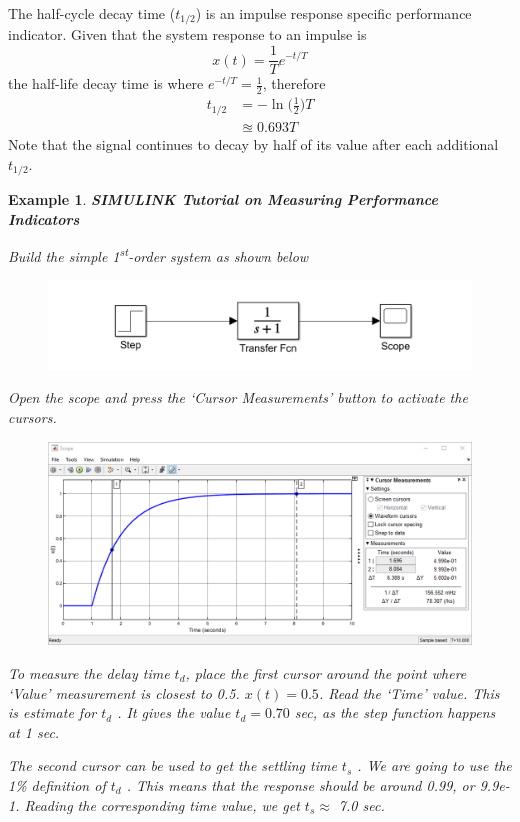 \documentclass[12pt,letter]{article}
\newtheorem{ex}{Example}
\numberwithin{ex}{section} %
\newenvironment{example}{\begin{mdframed}[middlelinewidth=0.5mm]\begin{ex}\normalfont}{\end{ex}\end{mdframed}}
\numberwithin{re}{section} %
\numberwithin{equation}{section}	%
\begin{document}
The half-cycle decay time ($t_{1/2}$) is an impulse response specific performance indicator. Given that the system response to an impulse is
\begin{equation}
x(t) = \frac{1}{T} e^{-t/T}
\end{equation}
the half-life decay time is where $e^{-t/T} = \frac{1}{2}$, therefore
\begin{align}
t_{1/2} &= - \ln \bigg(\frac{1}{2} \bigg) T \\
&\approxeq 0.693T \nonumber
\end{align}
Note that the signal continues to decay by half of its value after each additional $t_{1/2}$.





\begin{example}

\textbf{SIMULINK Tutorial on Measuring Performance Indicators}

Build the simple 1\textsuperscript{st}-order system as shown below
\begin{figure}[H]
	\centering
	\includegraphics[width=4.5in]{../figures/Simulink_step_model_transfer}
\end{figure}
Open the scope and press the `Cursor Measurements' button to activate the cursors.

\begin{figure}[H]
	\centering
	\includegraphics[width=6.0in]{../figures/Simulink_step_model_transfer_cursor_measurements}
\end{figure}




To measure the delay time $t_d$, place the first cursor around the point where `Value' measurement is closest to 0.5. $x(t) = 0.5$. Read the `Time' value. This is estimate for $t_d$ . It gives the value $t_d = 0.70$ sec, as the step function happens at 1 sec. 

The second cursor can be used to get the settling time $t_s$ . We are going to use the 1\% definition of $t_d$ . This means that the response should be around 0.99, or 9.9e-1. Reading the corresponding time value, we get $t_s \approx$  7.0 sec. 

\end{example}
\end{document}
